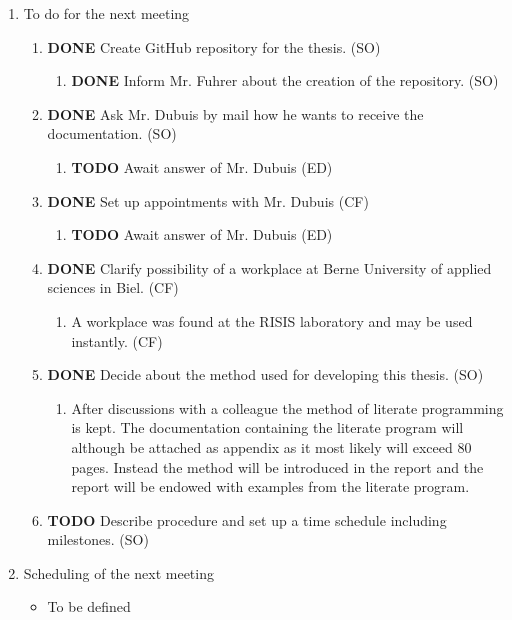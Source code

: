 \documentclass[10pt, openright, notitlepage]{scrreprt}
\begin{document}
\begin{enumerate}
\item To do for the next meeting
\label{sec:org4295c23}

\begin{enumerate}
\item {\bfseries\sffamily DONE} Create GitHub repository for the thesis. (SO)
\label{sec:orgfb0506f}
\begin{enumerate}
\item {\bfseries\sffamily DONE} Inform Mr. Fuhrer about the creation of the repository. (SO)
\label{sec:org70cc49d}
\end{enumerate}

\item {\bfseries\sffamily DONE} Ask Mr. Dubuis by mail how he wants to receive the documentation. (SO)
\label{sec:org11e6cdf}
\begin{enumerate}
\item {\bfseries\sffamily TODO} Await answer of Mr. Dubuis (ED)
\label{sec:org0140f70}
\end{enumerate}

\item {\bfseries\sffamily DONE} Set up appointments with Mr. Dubuis (CF)
\label{sec:org7476328}
\begin{enumerate}
\item {\bfseries\sffamily TODO} Await answer of Mr. Dubuis (ED)
\label{sec:org53aa7fb}
\end{enumerate}

\item {\bfseries\sffamily DONE} Clarify possibility of a workplace at Berne University of applied sciences in Biel. (CF)
\label{sec:orgf2230ab}
\begin{enumerate}
\item A workplace was found at the RISIS laboratory and may be used instantly. (CF)
\label{sec:org900cda5}
\end{enumerate}

\item {\bfseries\sffamily DONE} Decide about the method used for developing this thesis. (SO)
\label{sec:orgf3283b5}
\begin{enumerate}
\item After discussions with a colleague the method of literate programming is
\label{sec:orge66b260}
kept. The documentation containing the literate program will although be
attached as appendix as it most likely will exceed 80 pages. Instead the
method will be introduced in the report and the report will be endowed
with examples from the literate program.
\end{enumerate}

\item {\bfseries\sffamily TODO} Describe procedure and set up a time schedule including milestones. (SO)
\label{sec:orgafa863b}
\end{enumerate}

\item Scheduling of the next meeting
\label{sec:org0e22edf}

\begin{itemize}
\item To be defined
\end{itemize}
\end{enumerate}
\end{document}
